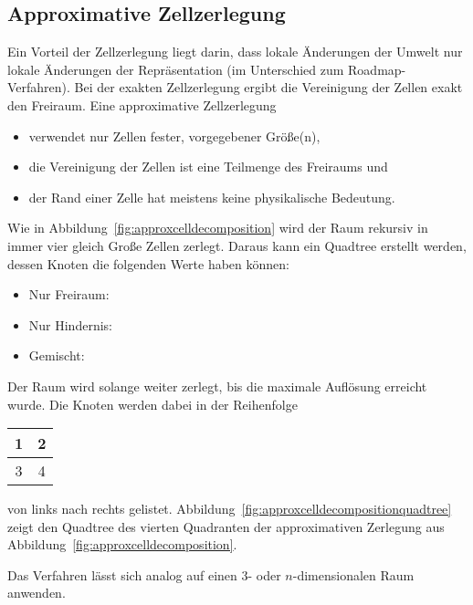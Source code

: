 		\subsection{Approximative Zellzerlegung}
			Ein Vorteil der Zellzerlegung liegt darin, dass lokale Änderungen der Umwelt nur lokale Änderungen der Repräsentation (im Unterschied zum Roadmap-Verfahren). Bei der exakten Zellzerlegung ergibt die Vereinigung der Zellen exakt den Freiraum. Eine approximative Zellzerlegung
			\begin{itemize}
				\item verwendet nur Zellen fester, vorgegebener Größe(n),
				\item die Vereinigung der Zellen ist eine Teilmenge des Freiraums und
				\item der Rand einer Zelle hat meistens keine physikalische Bedeutung.
			\end{itemize}
			Wie in Abbildung~\ref{fig:approxcelldecomposition} wird der Raum rekursiv in immer vier gleich Große Zellen zerlegt. Daraus kann ein Quadtree erstellt werden, dessen Knoten die folgenden Werte haben können:
			\begin{itemize}
				\item Nur Freiraum:  \tabto{3cm} \whiteBox
				\item Nur Hindernis: \tabto{3cm} \blackBox
				\item Gemischt:      \tabto{3cm} \grayBox
			\end{itemize}
			Der Raum wird solange weiter zerlegt, bis die maximale Auflösung erreicht wurde. Die Knoten werden dabei in der Reihenfolge
			\begin{table}[H]
				\centering
				\begin{tabular}{|c|c|}
					\hline
					\num{1} & \num{2} \\ \hline
					\num{3} & \num{4} \\ \hline
				\end{tabular}
			\end{table}
			von links nach rechts gelistet. Abbildung~\ref{fig:approxcelldecompositionquadtree} zeigt den Quadtree des vierten Quadranten der approximativen Zerlegung aus Abbildung~\ref{fig:approxcelldecomposition}.

			Das Verfahren lässt sich analog auf einen 3- oder \(n\)-dimensionalen Raum anwenden.

